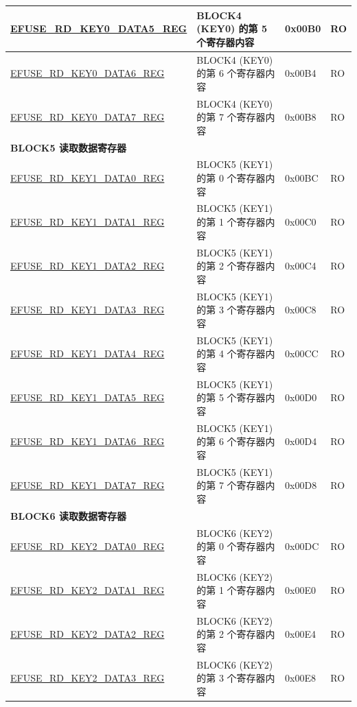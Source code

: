 \begin{longtable}{ | p{7cm} | p{7.2cm} | p{1.3cm} | p{1cm} | }
\hyperref[regdesc:EFUSERDKEY0DATANREG]{EFUSE\_RD\_KEY0\_DATA5\_REG} & BLOCK4 (KEY0) 的第 5 个寄存器内容 & 0x00B0 & RO \\ \hline
\hyperref[regdesc:EFUSERDKEY0DATANREG]{EFUSE\_RD\_KEY0\_DATA6\_REG} & BLOCK4 (KEY0) 的第 6 个寄存器内容 & 0x00B4 & RO \\ \hline
\hyperref[regdesc:EFUSERDKEY0DATANREG]{EFUSE\_RD\_KEY0\_DATA7\_REG} & BLOCK4 (KEY0) 的第 7 个寄存器内容 & 0x00B8 & RO \\ \hline
\multicolumn{4}{|l|}{\textbf{BLOCK5 读取数据寄存器}} \\ \hline
\hyperref[regdesc:EFUSERDKEY1DATAMREG]{EFUSE\_RD\_KEY1\_DATA0\_REG} & BLOCK5 (KEY1) 的第 0 个寄存器内容 & 0x00BC & RO \\ \hline
\hyperref[regdesc:EFUSERDKEY1DATAMREG]{EFUSE\_RD\_KEY1\_DATA1\_REG} & BLOCK5 (KEY1) 的第 1 个寄存器内容 & 0x00C0 & RO \\ \hline
\hyperref[regdesc:EFUSERDKEY1DATAMREG]{EFUSE\_RD\_KEY1\_DATA2\_REG} & BLOCK5 (KEY1) 的第 2 个寄存器内容 & 0x00C4 & RO \\ \hline
\hyperref[regdesc:EFUSERDKEY1DATAMREG]{EFUSE\_RD\_KEY1\_DATA3\_REG} & BLOCK5 (KEY1) 的第 3 个寄存器内容 & 0x00C8 & RO \\ \hline
\hyperref[regdesc:EFUSERDKEY1DATAMREG]{EFUSE\_RD\_KEY1\_DATA4\_REG} & BLOCK5 (KEY1) 的第 4 个寄存器内容 & 0x00CC & RO \\ \hline
\hyperref[regdesc:EFUSERDKEY1DATAMREG]{EFUSE\_RD\_KEY1\_DATA5\_REG} & BLOCK5 (KEY1) 的第 5 个寄存器内容 & 0x00D0 & RO \\ \hline
\hyperref[regdesc:EFUSERDKEY1DATAMREG]{EFUSE\_RD\_KEY1\_DATA6\_REG} & BLOCK5 (KEY1) 的第 6 个寄存器内容 & 0x00D4 & RO \\ \hline
\hyperref[regdesc:EFUSERDKEY1DATAMREG]{EFUSE\_RD\_KEY1\_DATA7\_REG} & BLOCK5 (KEY1) 的第 7 个寄存器内容 & 0x00D8 & RO \\ \hline
\multicolumn{4}{|l|}{\textbf{BLOCK6 读取数据寄存器}} \\ \hline
\hyperref[regdesc:EFUSERDKEY2DATANREG]{EFUSE\_RD\_KEY2\_DATA0\_REG} & BLOCK6 (KEY2) 的第 0 个寄存器内容 & 0x00DC & RO \\ \hline
\hyperref[regdesc:EFUSERDKEY2DATANREG]{EFUSE\_RD\_KEY2\_DATA1\_REG} & BLOCK6 (KEY2) 的第 1 个寄存器内容 & 0x00E0 & RO \\ \hline
\hyperref[regdesc:EFUSERDKEY2DATANREG]{EFUSE\_RD\_KEY2\_DATA2\_REG} & BLOCK6 (KEY2) 的第 2 个寄存器内容 & 0x00E4 & RO \\ \hline
\hyperref[regdesc:EFUSERDKEY2DATANREG]{EFUSE\_RD\_KEY2\_DATA3\_REG} & BLOCK6 (KEY2) 的第 3 个寄存器内容 & 0x00E8 & RO \\ \hline

\end{longtable}
